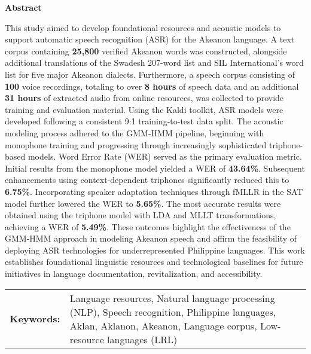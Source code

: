 \begin{center}
\textbf{Abstract}
\end{center}
\setlength{\parindent}{0pt}
This study aimed to develop foundational resources and acoustic models to support automatic speech recognition (ASR) for the Akeanon language. A text corpus containing \textbf{25,800} verified Akeanon words was constructed, alongside additional translations of the Swadesh 207-word list and SIL International's word list for five major Akeanon dialects. Furthermore, a speech corpus consisting of \textbf{100} voice recordings, totaling to over \textbf{8 hours} of speech data and an additional \textbf{31 hours} of extracted audio from online resources, was collected to provide training and evaluation material. Using the Kaldi toolkit, ASR models were developed following a consistent 9:1 training-to-test data split. The acoustic modeling process adhered to the GMM-HMM pipeline, beginning with monophone training and progressing through increasingly sophisticated triphone-based models. Word Error Rate (WER) served as the primary evaluation metric. Initial results from the monophone model yielded a WER of \textbf{43.64\%}. Subsequent enhancements using context-dependent triphones significantly reduced this to \textbf{6.75\%}. Incorporating speaker adaptation techniques through fMLLR in the SAT model further lowered the WER to \textbf{5.65\%}. The most accurate results were obtained using the triphone model with LDA and MLLT transformations, achieving a WER of \textbf{5.49\%}. These outcomes highlight the effectiveness of the GMM-HMM approach in modeling Akeanon speech and affirm the feasibility of deploying ASR technologies for underrepresented Philippine languages. This work establishes foundational linguistic resources and technological baselines for future initiatives in language documentation, revitalization, and accessibility.

\begin{tabular}{lp{4.25in}}
\hspace{-0.5em}\textbf{Keywords:}\hspace{0.25em} & Language resources, Natural language processing (NLP), Speech recognition, Philippine languages, Aklan, Aklanon, Akeanon, Language corpus, Low-resource languages (LRL)\\
\end{tabular}